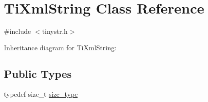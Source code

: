 \hypertarget{class_ti_xml_string}{\section{Ti\+Xml\+String Class Reference}
\label{class_ti_xml_string}
}


{\ttfamily \#include $<$tinystr.\+h$>$}



Inheritance diagram for Ti\+Xml\+String\+:
\subsection*{Public Types}
\begin{DoxyCompactItemize}
\item 
typedef size\+\_\+t \hyperlink{class_ti_xml_string_abeb2c1893a04c17904f7c06546d0b971}{size\+\_\+type}
\end{DoxyCompactItemize}
